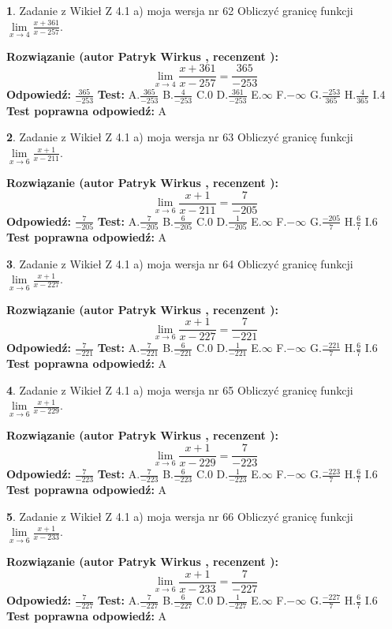 \documentclass[12pt, a4paper]{article}
\theoremstyle{definition} %
\newtheorem{zad}{}
\newcommand{\zadStart}[1]{\begin{zad}#1\newline}
\newcommand{\zadStop}{\end{zad}}
\newcommand{\rozwStart}[2]{\noindent \textbf{Rozwiązanie (autor #1 , recenzent #2): }\newline}
\newcommand{\rozwStop}{\newline}
\newcommand{\odpStart}{\noindent \textbf{Odpowiedź:}\newline}
\newcommand{\odpStop}{\newline}
\newcommand{\testStart}{\noindent \textbf{Test:}\newline}
\newcommand{\testStop}{\newline}
\newcommand{\kluczStart}{\noindent \textbf{Test poprawna odpowiedź:}\newline}
\newcommand{\kluczStop}{\newline}
\begin{document}
\zadStart{Zadanie z Wikieł Z 4.1 a) moja wersja nr 62}
Obliczyć granicę funkcji $\lim\limits_{x\to4}\frac{x+361}{x-257}$.
\zadStop
\rozwStart{Patryk Wirkus}{}
$$\lim\limits_{x\to4}\frac{x+361}{x-257} = \frac{365}{-253}$$
\rozwStop
\odpStart
$\frac{365}{-253}$
\odpStop
\testStart
A.$\frac{365}{-253}$
B.$\frac{4}{-253}$
C.$0$
D.$\frac{361}{-253}$
E.$\infty$
F.$-\infty$
G.$\frac{-253}{365}$
H.$\frac{4}{365}$
I.$4$
\testStop
\kluczStart
A
\kluczStop



\zadStart{Zadanie z Wikieł Z 4.1 a) moja wersja nr 63}
Obliczyć granicę funkcji $\lim\limits_{x\to6}\frac{x+1}{x-211}$.
\zadStop
\rozwStart{Patryk Wirkus}{}
$$\lim\limits_{x\to6}\frac{x+1}{x-211} = \frac{7}{-205}$$
\rozwStop
\odpStart
$\frac{7}{-205}$
\odpStop
\testStart
A.$\frac{7}{-205}$
B.$\frac{6}{-205}$
C.$0$
D.$\frac{1}{-205}$
E.$\infty$
F.$-\infty$
G.$\frac{-205}{7}$
H.$\frac{6}{7}$
I.$6$
\testStop
\kluczStart
A
\kluczStop



\zadStart{Zadanie z Wikieł Z 4.1 a) moja wersja nr 64}
Obliczyć granicę funkcji $\lim\limits_{x\to6}\frac{x+1}{x-227}$.
\zadStop
\rozwStart{Patryk Wirkus}{}
$$\lim\limits_{x\to6}\frac{x+1}{x-227} = \frac{7}{-221}$$
\rozwStop
\odpStart
$\frac{7}{-221}$
\odpStop
\testStart
A.$\frac{7}{-221}$
B.$\frac{6}{-221}$
C.$0$
D.$\frac{1}{-221}$
E.$\infty$
F.$-\infty$
G.$\frac{-221}{7}$
H.$\frac{6}{7}$
I.$6$
\testStop
\kluczStart
A
\kluczStop



\zadStart{Zadanie z Wikieł Z 4.1 a) moja wersja nr 65}
Obliczyć granicę funkcji $\lim\limits_{x\to6}\frac{x+1}{x-229}$.
\zadStop
\rozwStart{Patryk Wirkus}{}
$$\lim\limits_{x\to6}\frac{x+1}{x-229} = \frac{7}{-223}$$
\rozwStop
\odpStart
$\frac{7}{-223}$
\odpStop
\testStart
A.$\frac{7}{-223}$
B.$\frac{6}{-223}$
C.$0$
D.$\frac{1}{-223}$
E.$\infty$
F.$-\infty$
G.$\frac{-223}{7}$
H.$\frac{6}{7}$
I.$6$
\testStop
\kluczStart
A
\kluczStop



\zadStart{Zadanie z Wikieł Z 4.1 a) moja wersja nr 66}
Obliczyć granicę funkcji $\lim\limits_{x\to6}\frac{x+1}{x-233}$.
\zadStop
\rozwStart{Patryk Wirkus}{}
$$\lim\limits_{x\to6}\frac{x+1}{x-233} = \frac{7}{-227}$$
\rozwStop
\odpStart
$\frac{7}{-227}$
\odpStop
\testStart
A.$\frac{7}{-227}$
B.$\frac{6}{-227}$
C.$0$
D.$\frac{1}{-227}$
E.$\infty$
F.$-\infty$
G.$\frac{-227}{7}$
H.$\frac{6}{7}$
I.$6$
\testStop
\kluczStart
A
\kluczStop
\end{document}
